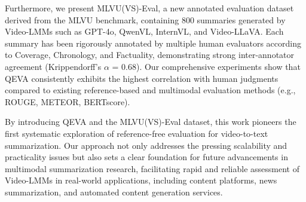 Furthermore, we present MLVU(VS)-Eval, a new annotated evaluation dataset derived from the MLVU benchmark, containing 800 summaries generated by Video-LMMs such as GPT-4o, QwenVL, InternVL, and Video-LLaVA. Each summary has been rigorously annotated by multiple human evaluators according to Coverage, Chronology, and Factuality, demonstrating strong inter-annotator agreement (Krippendorff's $\alpha$ = 0.68). Our comprehensive experiments show that QEVA consistently exhibits the highest correlation with human judgments compared to existing reference-based and multimodal evaluation methods (e.g., ROUGE, METEOR, BERTscore).

By introducing QEVA and the MLVU(VS)-Eval dataset, this work pioneers the first systematic exploration of reference-free evaluation for video-to-text summarization. Our approach not only addresses the pressing scalability and practicality issues but also sets a clear foundation for future advancements in multimodal summarization research, facilitating rapid and reliable assessment of Video-LMMs in real-world applications, including content platforms, news summarization, and automated content generation services.


% 